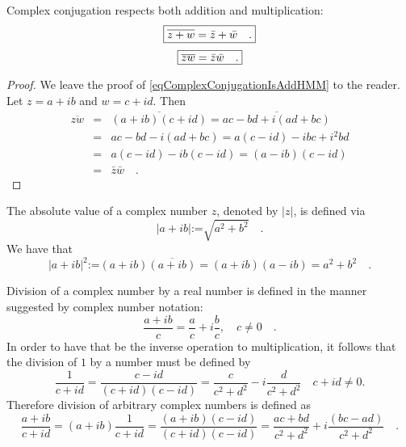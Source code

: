 \documentclass[12pt]{book}
\newcommand{\eqdef}{\textbf{:=}}
\newcommand{\importantFormula}[1]{\begin{equation} \boxed{#1} \end{equation}}
\begin{document}
\begin{proposition}
Complex conjugation respects both addition and multiplication:
\importantFormula{
\label{eqComplexConjugationIsAddHMM}
\overline {z +w}= \bar z +\bar w\quad .
}
\importantFormula{
\label{eqComplexConjugationIsFieldHMM}  \overline {z w}= \bar z \bar w\quad .
}

\end{proposition}
\begin{proof}
We leave the proof of \eqref{eqComplexConjugationIsAddHMM} to the reader. Let $z= a+ib$ and $w=c+id$. Then
\begin{equation*}
\begin{array}{rcl}\overline {zw}&=& \overline{(a+ib)(c+id)}= \overline{ac-bd +i(ad+bc) }\\&=& ac-bd-i(ad+bc)= a(c-id)-ibc+i^{2}bd\\&=& a(c-id)-ib(c-id)= (a-ib)(c-id)\\&=&\bar z \bar w\quad .
\end{array}
\end{equation*}
\end{proof}
  The absolute value of a complex number $z$, denoted by $|z|$, is defined via
\[
|a+ib|\eqdef \sqrt{a^2+b^2}\quad .
\]
We have that
\[
|a+ib|^2\eqdef (a+ib)\overline{(a+ib)}=(a+ib)(a-ib)=a^2+b^2 \quad .
\]

Division of a complex number by a real number is defined in the manner suggested by complex number notation:
\[
\frac{a+ib}{c}= \frac{a}{c}+i\frac{b}{c}, \quad c\neq 0\quad .
\]
In order to have that be the inverse operation to multiplication, it follows that the division of $1$ by a number must be defined by
\[
\frac{1}{c+id}= \frac{c-id}{(c+id)(c-id)}=\frac{c}{c^2+d^2}-i\frac{d}{c^2+d^2}  \quad c+id\neq 0.
\]
Therefore division of arbitrary complex numbers is defined as
\[
\frac{a+ib}{c+id}=(a+ib)\frac{1}{c+id}= \frac{(a+ib)(c-id)}{(c+id)(c-id)}= \frac{ac+bd}{c^2+d^2}+i\frac{(bc-ad)}{c^2+d^2} \quad .
\]
\end{document}
